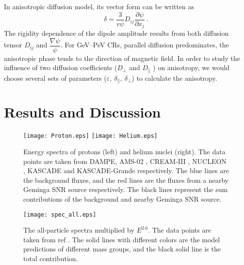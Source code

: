 \documentclass[a4paper,11pt]{article}
\begin{document}
In anisotropic diffusion model,  its vector form can be written as \citep{2016PhRvL.117o1103A, 2020ApJ...892....6L}
\begin{equation}
{\delta} =  \dfrac{3}{v \psi} D_{ij}  \dfrac{ \partial \psi}{ \partial x_j} ~.
\end{equation}
The rigidity dependence of the  dipole amplitude results from both diffusion tensor  $D_{ij}$ and $\dfrac{ \nabla \psi}{ \psi}$.
For GeV–PeV CRs, %
parallel diffusion predominates, the anisotropic phase tends to the direction of magnetic field.
In order to study the influence of two diffusion coefficients ($D_\perp$ and $D_\parallel$ ) on anisotropy, we would choose several  sets of  parameters ($\varepsilon,~  \delta_\parallel,~  \delta_\perp$) to calculate the anisotropy.


\section{Results and Discussion}\label{sec:results}

\begin{figure*}[!ht]
	\texttt{[image: Proton.eps]}
	\texttt{[image: Helium.eps]}
	\caption{Energy spectra of protons (left) and helium nuclei (right). The data 
		points are taken from 
		DAMPE\citep {2019SciA....5.3793A, 2021PhRvL.126t1102A},
		AMS-02 \citep{2015PhRvL.114q1103A, 2017PhRvL.119y1101A},
		CREAM-III \citep{2017ApJ...839....5Y}, NUCLEON \citep{2017JCAP...07..020A}, KASCADE \citep{2005APh....24....1A} and KASCADE-Grande \citep{2013APh....47...54A} respectively.  The blue lines are the background fluxes, and the red lines are the fluxes from a nearby Geminga SNR source respectively. The black lines  represent the sum contributions of the background and nearby Geminga SNR source.
	}
	\label{fig:Fig1}
\end{figure*}


\begin{figure*}
	\centering
	\texttt{[image: spec\_all.eps]}
	\caption{The all-particle spectra multiplied by $E^{2.6}$.
		The data points are taken from ref  \citep{2003APh....19..193H}.
		The solid lines with different colors are the model predictions of different mass groups, and the black solid line is the total contribution.
	}
	\label{fig:all_spec}
\end{figure*}
\end{document}

